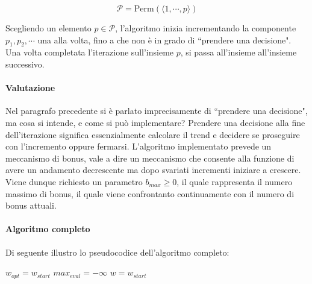 $$
\mathcal{P} = \text{Perm}(\langle1,\cdots, p\rangle)
$$

Scegliendo un elemento $p \in \mathcal{P}$, l'algoritmo
inizia incrementando la componente $p_1, p_2, \cdots$ una alla volta, fino a che
non è in grado di ``prendere una decisione".
Una volta completata l'iterazione sull'insieme $p$, si passa all'insieme all'insieme successivo.

\paragraph{Valutazione}
Nel paragrafo precedente si è parlato imprecisamente di
``prendere una decisione", ma cosa si intende, e come si può
implementare?
Prendere una decisione alla fine dell'iterazione significa essenzialmente
calcolare il trend e decidere se proseguire con l'incremento oppure
fermarsi. L'algoritmo implementato prevede un meccanismo di bonus,
vale a dire un meccanismo che consente alla funzione di avere un andamento
decrescente ma dopo svariati incrementi iniziare a crescere.
Viene dunque richiesto un parametro $b_{max} \geq 0$, il quale rappresenta
il numero massimo di bonus, il quale viene confrontanto continuamente con il
numero di bonus attuali.

\paragraph{Algoritmo completo}
Di seguente illustro lo pseudocodice dell'algoritmo completo:

\begin{algorithm}[h!]
	\small
	\DontPrintSemicolon
	\BlankLine
	$w_{opt} = w_{start}$\;
	$max_{eval} = -\infty$\;
	$w = w_{start}$\;
	
	\BlankLine
	
	\caption{\textsc{}}
	\label{alg:gs}
\end{algorithm}


